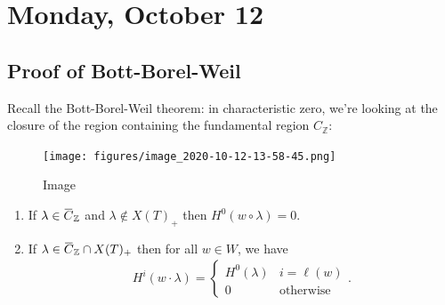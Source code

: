\hypertarget{monday-october-12}{%
\section{Monday, October 12}\label{monday-october-12}}

\hypertarget{proof-of-bott-borel-weil}{%
\subsection{Proof of Bott-Borel-Weil}\label{proof-of-bott-borel-weil}}

Recall the Bott-Borel-Weil theorem: in characteristic zero, we're
looking at the closure of the region containing the fundamental region
\(C_{\mathbb{Z}}\):

\begin{figure}
\centering
\texttt{[image: figures/image\_2020-10-12-13-58-45.png]}
\caption{Image}
\end{figure}

\begin{theorem}

\begin{theorem}

\begin{enumerate}
\def\labelenumi{\alph{enumi}.}
\item
  If
  \(\lambda \in \mkern 1.5mu\overline{\mkern-1.5muC\mkern-1.5mu}\mkern 1.5mu_{\mathbb{Z}}\)
  and \(\lambda \not\in X(T)_+\) then \(H^0(w\circ \lambda) = 0\).
\item
  If
  \(\lambda\in \mkern 1.5mu\overline{\mkern-1.5muC\mkern-1.5mu}\mkern 1.5mu_{\mathbb{Z}}\cap X(T)_+\)
  then for all \(w\in W\), we have
  \begin{align*}       H^i(w\cdot \lambda) =      \begin{cases}     H^0(\lambda)& i = \ell(w) \\     0 & \text{otherwise}     \end{cases}     .\end{align*}
\end{enumerate}

\end{theorem}

\end{theorem}

